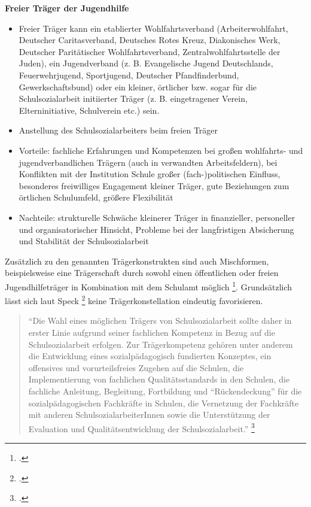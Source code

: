 \noindent
\textbf{Freier Träger der Jugendhilfe}
\begin{itemize}
	\item Freier Träger kann ein etablierter Wohlfahrtsverband (Arbeiterwohlfahrt, Deutscher Caritasverband, Deutsches Rotes Kreuz, Diakonisches Werk, Deutscher Paritätischer Wohlfahrtsverband, Zentralwohlfahrtsstelle der Juden), ein Jugendverband (z. B. Evangelische Jugend Deutschlands, Feuerwehrjugend, Sportjugend, Deutscher Pfandfinderbund, Gewerkschaftsbund) oder ein kleiner, örtlicher bzw. sogar für die Schulsozialarbeit initiierter Träger (z. B. eingetragener Verein, Elterninitiative, Schulverein etc.) sein.
	\item Anstellung des Schulsozialarbeiters beim freien Träger
	\item Vorteile: fachliche Erfahrungen und Kompetenzen bei großen wohlfahrts- und jugendverbandlichen Trägern (auch in verwandten Arbeitsfeldern), bei Konflikten mit der Institution Schule großer (fach-)politischen Einfluss, besonderes freiwilliges Engagement kleiner Träger, gute Beziehungen zum örtlichen Schulumfeld, größere Flexibilität
	\item Nachteile: strukturelle Schwäche kleinerer Träger in finanzieller, personeller und organisatorischer Hinsicht, Probleme bei der langfristigen Absicherung und Stabilität der Schulsozialarbeit 
\end{itemize}

\noindent
Zusätzlich zu den genannten Trägerkonstrukten sind auch Mischformen, beispielsweise eine Trägerschaft durch sowohl einen öffentlichen oder freien Jugendhilfeträger in Kombination mit dem Schulamt möglich \footcite[vgl.][63]{Spies2011}. Grundsätzlich lässt sich laut Speck \footcite{BIVSD2013} keine Trägerkonstellation eindeutig favorisieren.

\begin{quotation}
\noindent
"`Die Wahl eines möglichen Trägers von Schulsozialarbeit sollte daher in erster Linie aufgrund seiner fachlichen Kompetenz in Bezug auf die Schulsozialarbeit erfolgen. Zur Trägerkompetenz gehören unter anderem die Entwicklung eines sozialpädagogisch fundierten Konzeptes, ein offensives und vorurteilsfreies Zugehen auf die Schulen, die Implementierung von fachlichen Qualitätsstandards in den Schulen, die fachliche Anleitung, Begleitung, Fortbildung und "`Rückendeckung"' für die sozialpädagogischen Fachkräfte in Schulen, die Vernetzung der Fachkräfte mit anderen SchulsozialarbeiterInnen sowie die Unterstützung der Evaluation und Qualitätsentwicklung der Schulsozialarbeit."' \footcite{BIVSD2013}
\end{quotation}

